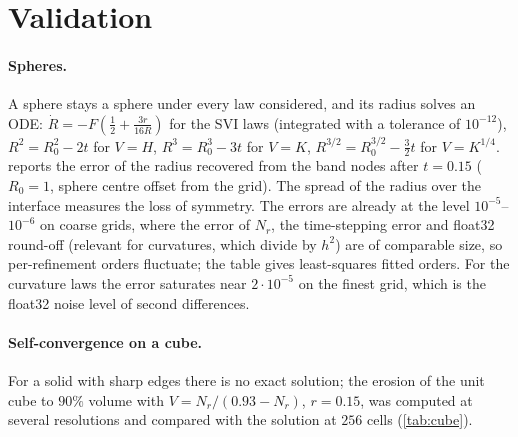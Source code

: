 \documentclass[11pt]{article}
\newcommand{\N}{N_r}
\begin{document}
\begin{table}[h]
\centering\small

\caption{Complete runs on the synthetic scan ($0.79$M triangles): SDF construction, evolution to
$90\%$ volume and meshing (marching cubes, projection, per-vertex fields).}\label{tab:perf}
\end{table}

\section{Validation}

\paragraph{Spheres.} A sphere stays a sphere under every law considered, and its radius solves an ODE:
$\dot R=-F(\frac12+\frac{3r}{16R})$ for the SVI laws (integrated with a tolerance of $10^{-12}$),
$R^2=R_0^2-2t$ for $V=H$, $R^3=R_0^3-3t$ for $V=K$, $R^{3/2}=R_0^{3/2}-\frac32t$ for $V=K^{1/4}$.
 reports the error of the radius recovered from the band nodes after $t=0.15$ ($R_0=1$,
sphere centre offset from the grid). The spread of the radius over the interface measures the loss of
symmetry. The errors are already at the level $10^{-5}$--$10^{-6}$ on coarse grids, where the error of
$\N$, the time-stepping error and float32 round-off (relevant for curvatures, which divide by $h^2$) are
of comparable size, so per-refinement orders fluctuate; the table gives least-squares fitted orders. For
the curvature laws the error saturates near $2\cdot10^{-5}$ on the finest grid, which is the float32
noise level of second differences.

\begin{table}[h]
\centering\footnotesize

\caption{Flows on a sphere, $R_0=1$, $r=0.4$, final time $0.15$.}\label{tab:sphere}
\end{table}

\paragraph{Self-convergence on a cube.} For a solid with sharp edges there is no exact solution; the
erosion of the unit cube to $90\%$ volume with $V=\N/(0.93-\N)$, $r=0.15$, was computed at several
resolutions and compared with the solution at $256$ cells (\cref{tab:cube}).
\end{document}
